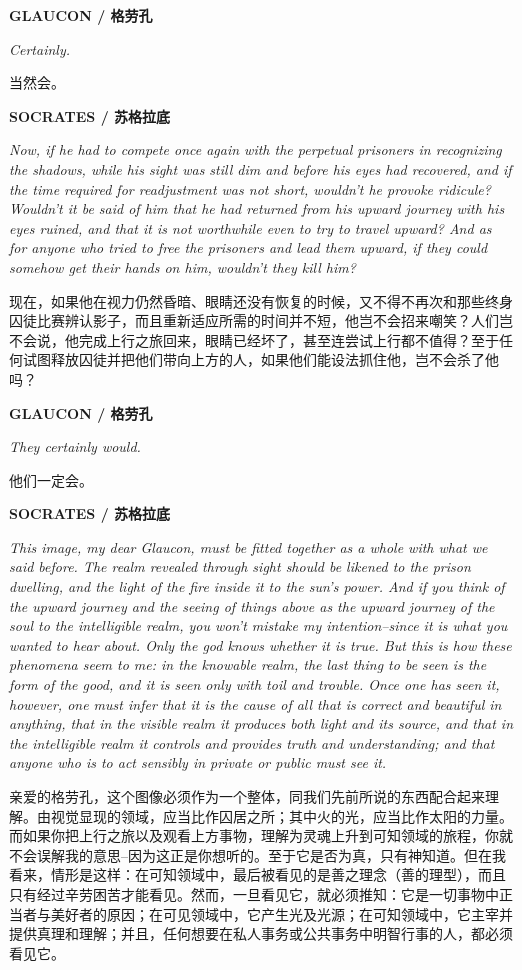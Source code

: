 \documentclass[UTF8]{ctexart}
\newcommand{\speaker}[2]{\par\medskip\noindent\textbf{#1 / #2}\par}
\newcommand{\en}[1]{\noindent\textit{#1}\par}
\newcommand{\zh}[1]{\noindent #1\par}
\begin{document}
\speaker{GLAUCON}{格劳孔}
\en{Certainly.}
\zh{当然会。}

\speaker{SOCRATES}{苏格拉底}
\en{Now, if he had to compete once again with the perpetual prisoners in recognizing the shadows, while his sight was still dim and before his eyes had recovered, and if the time required for readjustment was not short, wouldn't he provoke ridicule? Wouldn't it be said of him that he had returned from his upward journey with his eyes ruined, and that it is not worthwhile even to try to travel upward? And as for anyone who tried to free the prisoners and lead them upward, if they could somehow get their hands on him, wouldn't they kill him?}
\zh{现在，如果他在视力仍然昏暗、眼睛还没有恢复的时候，又不得不再次和那些终身囚徒比赛辨认影子，而且重新适应所需的时间并不短，他岂不会招来嘲笑？人们岂不会说，他完成上行之旅回来，眼睛已经坏了，甚至连尝试上行都不值得？至于任何试图释放囚徒并把他们带向上方的人，如果他们能设法抓住他，岂不会杀了他吗？}

\speaker{GLAUCON}{格劳孔}
\en{They certainly would.}
\zh{他们一定会。}

\speaker{SOCRATES}{苏格拉底}
\en{This image, my dear Glaucon, must be fitted together as a whole with what we said before. The realm revealed through sight should be likened to the prison dwelling, and the light of the fire inside it to the sun's power. And if you think of the upward journey and the seeing of things above as the upward journey of the soul to the intelligible realm, you won't mistake my intention--since it is what you wanted to hear about. Only the god knows whether it is true. But this is how these phenomena seem to me: in the knowable realm, the last thing to be seen is the form of the good, and it is seen only with toil and trouble. Once one has seen it, however, one must infer that it is the cause of all that is correct and beautiful in anything, that in the visible realm it produces both light and its source, and that in the intelligible realm it controls and provides truth and understanding; and that anyone who is to act sensibly in private or public must see it.}
\zh{亲爱的格劳孔，这个图像必须作为一个整体，同我们先前所说的东西配合起来理解。由视觉显现的领域，应当比作囚居之所；其中火的光，应当比作太阳的力量。而如果你把上行之旅以及观看上方事物，理解为灵魂上升到可知领域的旅程，你就不会误解我的意思--因为这正是你想听的。至于它是否为真，只有神知道。但在我看来，情形是这样：在可知领域中，最后被看见的是善之理念（善的理型），而且只有经过辛劳困苦才能看见。然而，一旦看见它，就必须推知：它是一切事物中正当者与美好者的原因；在可见领域中，它产生光及光源；在可知领域中，它主宰并提供真理和理解；并且，任何想要在私人事务或公共事务中明智行事的人，都必须看见它。}
\end{document}
